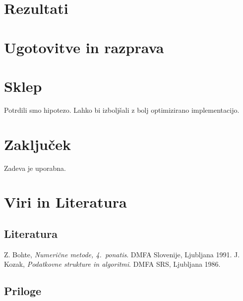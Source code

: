 \documentclass[a4paper,oneside]{article}
\begin{document}
%


\section{Rezultati}
\section{Ugotovitve in razprava}
\section{Sklep}
Potrdili smo hipotezo. Lahko bi izboljšali z bolj optimizirano implementacijo.
\section{Zaključek}
Zadeva je uporabna.
\section{Viri in Literatura}
\subsection{Literatura}
\vspace{-1cm}
\begin{thebibliography}{99}
   {Z. Bohte, \emph{Numerične metode, 4.\ ponatis}. DMFA Slovenije, Ljubljana 1991.}
   {J. Kozak, \emph{Podatkovne strukture in algoritmi}. DMFA SRS, Ljubljana 1986. }
\end{thebibliography}
\subsection{Priloge}
\end{document}
